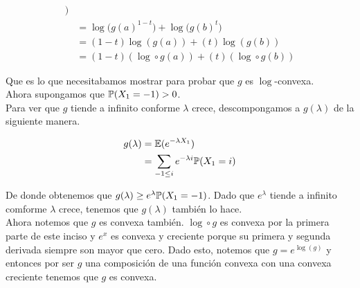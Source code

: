 \begin{align}
                                                \bigg)                                                                              \\
                                         &=      \log\bigg( 
                                                        g(a)^{1-t} 
                                                \bigg)
                                                        + 
                                                \log\bigg(
                                                        g(b)^{t}
                                                \bigg)                                                                              \\
                                         &=      (1-t)\log(g(a))+(t)\log(g(b))                                                      \\
                                         &=      (1-t)(\log \circ g (a))+(t)(\log \circ g (b))                                        
    \end{align}
    
    Que es lo que necesitabamos mostrar para probar que $g$ es $\log$-convexa.\\
    
    Ahora supongamos que $\mathbb{P}(X_1 = -1) > 0$.\\
    
    Para ver que $g$ tiende a infinito conforme $\lambda$ crece, descompongamos a $g(\lambda)$ de la siguiente manera.
    
    \begin{align}
        g(\lambda)      &=      \mathbb{E}(e^{-\lambda X_1})                \\
                        &=      \sum_{-1 \leq i} e^{-\lambda i} \mathbb{P}( X_1 = i)
    \end{align}
    
    De donde obtenemos que $g(\lambda) \geq e^{\lambda} \mathbb{P}( X_1 = -1)$. Dado que $e^{\lambda}$ tiende a infinito comforme
    $\lambda$ crece, tenemos que $g(\lambda)$ también lo hace.\\
    
    Ahora notemos que $g$ es convexa también. $\log \circ g$ es convexa por la primera parte de este inciso y 
    $e^x$ es convexa y creciente porque su primera y segunda derivada siempre son mayor que cero. 
    Dado esto, notemos que $g = e^{\log(g)}$ y entonces por ser $g$ una composición de una función convexa con una
    convexa creciente tenemos que $g$ es convexa.\\
    
